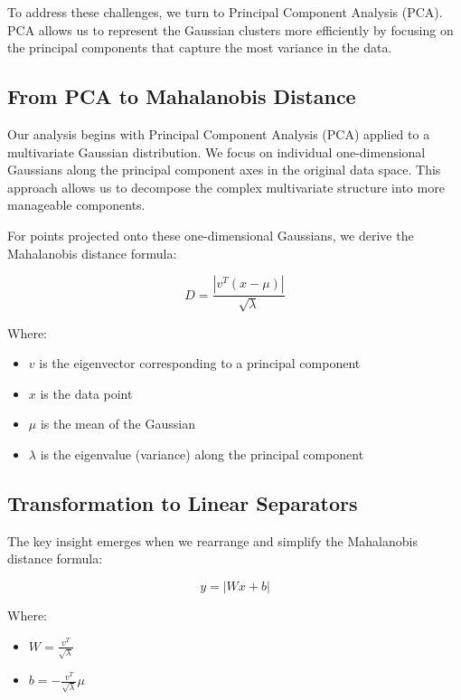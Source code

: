 \documentclass[11pt]{article}
\begin{document}
To address these challenges, we turn to Principal Component Analysis (PCA). PCA allows us to represent the Gaussian clusters more efficiently by focusing on the principal components that capture the most variance in the data.

\subsection{From PCA to Mahalanobis Distance}
Our analysis begins with Principal Component Analysis (PCA) applied to a multivariate Gaussian distribution. We focus on individual one-dimensional Gaussians along the principal component axes in the original data space. This approach allows us to decompose the complex multivariate structure into more manageable components.

For points projected onto these one-dimensional Gaussians, we derive the Mahalanobis distance formula:

\begin{equation}
D = \frac{|v^T(x - \mu)|}{\sqrt{\lambda}}
\end{equation}

Where:

\begin{itemize}
\item $v$ is the eigenvector corresponding to a principal component
\item $x$ is the data point
\item $\mu$ is the mean of the Gaussian
\item $\lambda$ is the eigenvalue (variance) along the principal component
\end{itemize}

\subsection{Transformation to Linear Separators}

The key insight emerges when we rearrange and simplify the Mahalanobis distance formula:

\begin{equation}
y = |Wx + b|
\end{equation}

Where:

\begin{itemize}
\item $W = \frac{v^T}{\sqrt{\lambda}}$
\item $b = -\frac{v^T}{\sqrt{\lambda}}\mu$
\end{itemize}
\end{document}
